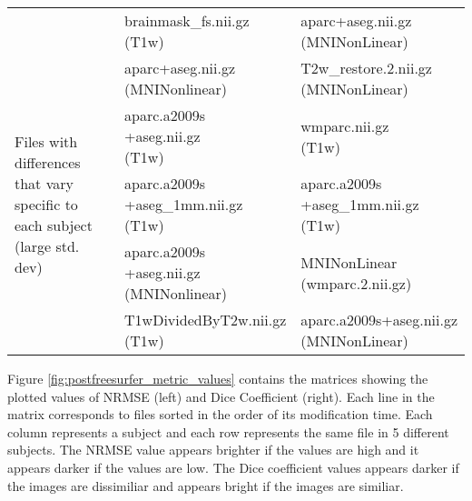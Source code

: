 \begin{center}
\begin{longtable}{|p{}|p{}|p{}|}
& \makecell[l]{brainmask\_fs.nii.gz\\(T1w)}  & \makecell[l]{aparc+aseg.nii.gz\\(MNINonLinear)} \\\cline{1-3}
\multirow{5}{.3\textwidth}{Files with differences that vary specific to each subject (large std. dev)}   & \makecell[l]{aparc+aseg.nii.gz\\(MNINonlinear)}  & \makecell[l]{T2w\_restore.2.nii.gz\\(MNINonLinear)} \\\cline{2-3}
& \makecell[l]{aparc.a2009s\\+aseg.nii.gz\\(T1w)}                              & \makecell[l]{wmparc.nii.gz\\(T1w)} \\\cline{2-3}
& \makecell[l]{aparc.a2009s\\+aseg\_1mm.nii.gz\\(T1w)}                         & \makecell[l]{aparc.a2009s\\+aseg\_1mm.nii.gz\\(T1w)} \\\cline{2-3}
& \makecell[l]{aparc.a2009s\\+aseg.nii.gz\\(MNINonlinear)}                   & \makecell[l]{MNINonLinear\\(wmparc.2.nii.gz)} \\\cline{2-3}
& \makecell[l]{T1wDividedByT2w.nii.gz\\(T1w)}                                & \makecell[l]{aparc.a2009s+aseg.nii.gz\\(MNINonLinear)} \\\cline{1-3}
\end{longtable}
\label{tab:PostFreeSurfer_comparison_table}
\end{center}
\hfill \break
\fi

Figure \ref{fig:postfreesurfer_metric_values} contains the matrices showing the plotted values of NRMSE (left) and Dice Coefficient (right). Each line in the matrix corresponds to files sorted in the order of its modification time. Each column represents a subject and each row represents the same file in 5 different subjects. The NRMSE value appears brighter if the values are high and it appears darker if the values are low. The Dice coefficient values appears darker if the images are dissimiliar and appears bright if the images are similiar.

